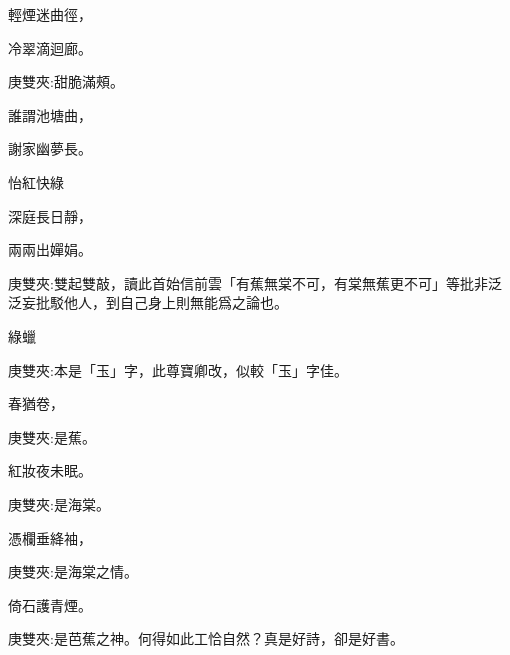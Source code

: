 \begin{poem}
    \begin{pl}輕煙迷曲徑，\end{pl}

    \begin{pl}冷翠滴迴廊。\end{pl}\begin{note}庚雙夾:甜脆滿頰。\end{note}

    \begin{pl}誰謂池塘曲，\end{pl}

    \begin{pl}謝家幽夢長。\end{pl}

    \begin{pl}怡紅快綠\end{pl}

    \begin{pl}深庭長日靜，\end{pl}

    \begin{pl}兩兩出嬋娟。\end{pl}\begin{note}庚雙夾:雙起雙敲，讀此首始信前雲「有蕉無棠不可，有棠無蕉更不可」等批非泛泛妄批駁他人，到自己身上則無能爲之論也。\end{note}

    \begin{pl}綠蠟\end{pl}\begin{note}庚雙夾:本是「玉」字，此尊寶卿改，似較「玉」字佳。\end{note}\begin{pl}春猶卷，\end{pl}\begin{note}庚雙夾:是蕉。\end{note}

    \begin{pl}紅妝夜未眠。\end{pl}\begin{note}庚雙夾:是海棠。\end{note}

    \begin{pl}憑欄垂絳袖，\end{pl}\begin{note}庚雙夾:是海棠之情。\end{note}

    \begin{pl}倚石護青煙。\end{pl}\begin{note}庚雙夾:是芭蕉之神。何得如此工恰自然？真是好詩，卻是好書。\end{note}


\end{poem}
